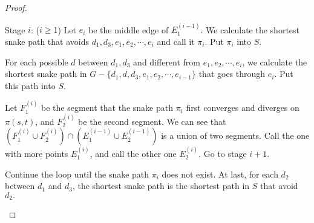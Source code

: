 \documentclass[11pt]{article}
\theoremstyle{plain}
\theoremstyle{definition}
\begin{document}
\begin{proof}
\begin{center}
 \end{center}

\noindent Stage $i$: ($i\ge 1$) Let $e_i$ be the middle edge of $E_1^{(i-1)}.$ We calculate the shortest snake path that avoids $d_1,d_3,e_1,e_2,\cdots,e_i$ and call it $\pi_i.$ Put $\pi_i$ into $S.$

For each possible $d$ between $d_1,d_3$ and different from $e_1,e_2,\cdots,e_i$, we calculate the shortest snake path in $G-\{d_1,d,d_3,e_1,e_2,\cdots,e_{i-1}\}$ that goes through $e_i.$ Put this path into $S.$

Let $F_1^{(i)}$ be the segment that the snake path $\pi_i$ first converges and diverges on $\pi(s,t)$, and $F_2^{(i)}$ be the second segment. We can see that $(F_1^{(i)}\cup F_2^{(i)})\cap(E_1^{(i-1)}\cup E_2^{(i-1)})$ is a union of two segments. Call the one with more points $E_1^{(i)}$, and call the other one $E_2^{(i)}.$ Go to stage $i+1$.

Continue the loop until the snake path $\pi_i$ does not exist. At last, for each $d_2$ between $d_1$ and $d_3$, the shortest snake path is the shortest path in $S$ that avoid $d_2.$

\begin{center}
    


\begin{tikzpicture}[x=0.75pt,y=0.75pt,yscale=-1,xscale=1]



\end{tikzpicture}
\end{center}
\end{proof}
\end{document}
